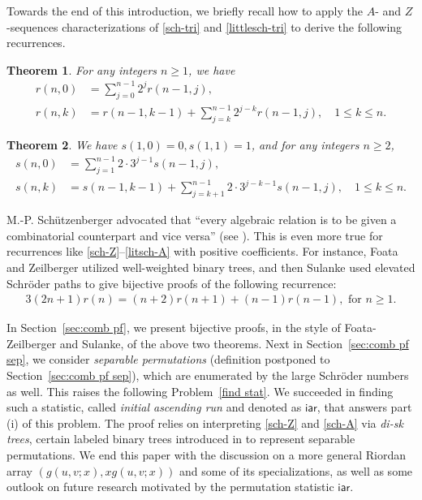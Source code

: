 \documentclass[11pt,reqno]{amsart}
\numberwithin{equation}{section}
\theoremstyle{plain}
\newtheorem{theorem}{Theorem}[section]
\theoremstyle{definition}
\def\iar{\mathsf{iar}}
\begin{document}
Towards the end of this introduction, we briefly recall how to apply the $A$- and $Z$-sequences characterizations of \eqref{sch-tri} and \eqref{littlesch-tri} to derive the following recurrences.

\begin{theorem}\label{thm:Sch}
For any integers $n\ge 1$, we have
\begin{align}
r(n,0)&=\sum\limits_{j=0}^{n-1}2^{j}r(n-1,j),\label{sch-Z}\\
r(n,k)&=r(n-1,k-1)+\sum\limits_{j=k}^{n-1}2^{j-k}r(n-1,j),\quad 1\le k\le n. \label{sch-A}
\end{align}
\end{theorem}


\begin{theorem}\label{thm:litSch}
We have $s(1,0)=0, s(1,1)=1$, and for any integers $n\ge 2$,
\begin{align}
s(n,0) &=\sum\limits_{j=1}^{n-1}2\cdot3^{j-1}s(n-1,j),\label{litsch-Z}\\
s(n,k) &=s(n-1,k-1)+\sum\limits_{j=k+1}^{n-1}2\cdot3^{j-k-1}s(n-1,j),\quad 1\le k\le n. \label{litsch-A}
\end{align}
\end{theorem}

M.-P. Sch\"utzenberger advocated that ``every algebraic relation is to be
given a combinatorial counterpart and vice versa'' (see \cite{FZ}). This is even more true for recurrences like \eqref{sch-Z}--\eqref{litsch-A} with positive coefficients. For instance, Foata and Zeilberger \cite{FZ} utilized well-weighted binary trees, and then Sulanke \cite{Sul} used elevated Schr\"oder paths to give bijective proofs of the following recurrence:
\begin{align*}
3(2n+1)r(n)=(n+2)r(n+1)+(n-1)r(n-1), \text{ for $n\ge 1$.}
\end{align*}

In Section~\ref{sec:comb pf}, we present bijective proofs, in the style of Foata-Zeilberger and Sulanke, of the above two theorems. Next in Section~\ref{sec:comb pf sep}, we consider \emph{separable permutations} (definition postponed to Section~\ref{sec:comb pf sep}), which are enumerated by the large Schr\"oder numbers as well. This raises the following Problem~\ref{find stat}. We succeeded in finding such a statistic, called \emph{initial ascending run} and denoted as $\iar$, that answers part (i) of this problem. The proof relies on interpreting \eqref{sch-Z} and \eqref{sch-A} via \emph{di-sk trees}, certain labeled binary trees introduced in \cite{FLZ} to represent separable permutations. We end this paper with the discussion on a more general Riordan array $(g(u,v;x),xg(u,v;x))$ and some of its specializations, as well as some outlook on future research motivated by the permutation statistic $\iar$.
\end{document}
